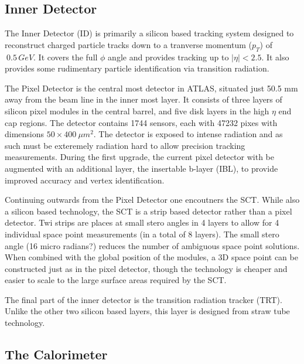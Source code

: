 \subsection{Inner Detector}

The Inner Detector (ID) is primarily a silicon based tracking system designed to reconstruct charged particle tracks down to a tranverse momentum ($p_{T}$) of $~0.5\, GeV$. It covers the full $\phi$ angle and provides tracking up to $|\eta|< 2.5$. It also provides some rudimentary particle identification via transition radiation.
 
The Pixel Detector is the central most detector in ATLAS, situated just 50.5 mm away from the beam line in the inner most layer. It consists of three layers of silicon pixel modules in the central barrel, and five disk layers in the high $\eta$ end cap regions. The detector contains 1744 sensors, each with 47232 pixes with dimensions $50 \times 400~\mu m^2$. The detector is exposed to intense radiation and as such must be exteremely radiation hard to allow precision tracking measurements. During the first upgrade, the current pixel detector with be augmented with an additional layer, the insertable b-layer (IBL), to provide improved accuracy and vertex identification. 

Continuing outwards from the Pixel Detector one encoutners the SCT. While also a silicon based technology, the SCT is a strip based detector rather than a pixel detector. Twi strips are places at small stero angles in 4 layers to allow for 4 individual space point measurements (in a total of 8 layers). The small stero angle (16 micro radians?) reduces the number of ambiguous space point solutions. When combined with the global position of the modules, a 3D space point can be constructed just as in the pixel detector, though the technology is cheaper and easier to scale to the large surface areas required by the SCT.

The final part of the inner detector is the transition radiation tracker (TRT). Unlike the other two silicon based layers, this layer is designed from straw tube technology.

\subsection{The Calorimeter}

